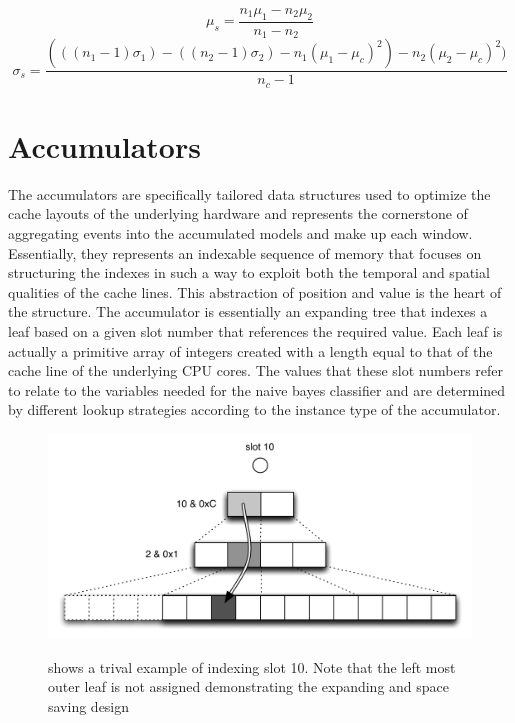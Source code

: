 \documentclass[a4paper,11pt]{scrreprt}
\begin{document}
\begin{myequations}
\begin{equation}
\mu_s = \frac{n_1\mu_1 - n_2\mu_2}{n_1 - n_2}
\end{equation}
\begin{equation}
\sigma_s = \frac{(((n_1 -1) \sigma_1) - ((n_2-1) \sigma_2) - n_1(\mu_1 - \mu_c)^2) - n_2(\mu_2 - \mu_c)^2)}{n_c-1}
\end{equation}
\label{eq:combiningparamssub}
\end{myequations}
 
\section{Accumulators}
The accumulators are specifically tailored data structures used to optimize the cache layouts of the underlying hardware and represents the cornerstone of aggregating events into the accumulated models and make up each window. Essentially, they represents an indexable sequence of memory that focuses on structuring the indexes in such a way to exploit both the temporal and spatial qualities of the cache lines. This abstraction of position and value is the heart of the structure. The accumulator is essentially an expanding tree that indexes a leaf based on a given slot number that references the required value. Each leaf is actually a primitive array of integers created with a length equal to that of the cache line of the underlying CPU cores. The values that these slot numbers refer to relate to the variables needed for the naive bayes classifier and are determined by different lookup strategies according to the instance type of the accumulator. \\
\begin{figure}[h!]
\centering
\caption{shows a trival example of indexing slot 10. Note that the left most outer leaf is not assigned demonstrating the expanding and space saving design}
\includegraphics[scale=0.72, trim=0 0 0 12, clip=true] {accumulator-lookup.pdf}
\label{fig:accumulator-lookup}
\end{figure}
\end{document}
